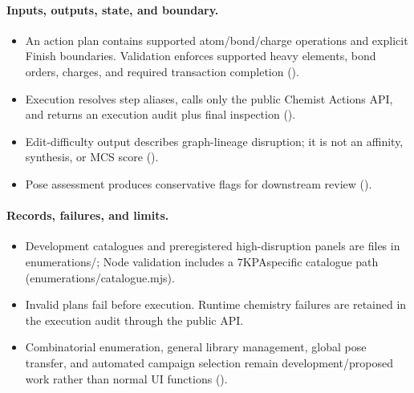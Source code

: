 \documentclass[11pt]{article}
\begin{document}
\begin{small}
\paragraph{Inputs, outputs, state, and boundary.}

\begin{itemize}[leftmargin=*]

\item An action plan contains supported atom/bond/charge operations and explicit Finish boundaries. Validation enforces supported heavy elements, bond orders, charges, and required transaction completion ().

\item Execution resolves step aliases, calls only the public Chemist Actions API, and returns an execution audit plus final inspection ().

\item Edit-difficulty output describes graph-lineage disruption; it is not an affinity, synthesis, or MCS score ().

\item Pose assessment produces conservative flags for downstream review ().

\end{itemize}

\paragraph{Records, failures, and limits.}

\begin{itemize}[leftmargin=*]

\item Development catalogues and preregistered high-disruption panels are files in enumerations/; Node validation includes a 7KPAspecific catalogue path (enumerations/catalogue.mjs).

\item Invalid plans fail before execution. Runtime chemistry failures are retained in the execution audit through the public API.

\item Combinatorial enumeration, general library management, global pose transfer, and automated campaign selection remain development/proposed work rather than normal UI functions ().


\end{itemize}
\end{small}
\end{document}
